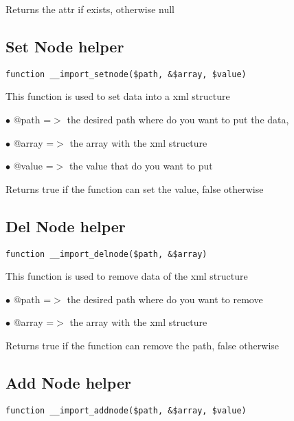 \documentclass[a4paper]{book}
\begin{document}
Returns the attr if exists, otherwise null

\hypertarget{toc161}{}
\subsection{Set Node helper}

\begin{lstlisting}
function __import_setnode($path, &$array, $value)
\end{lstlisting}

This function is used to set data into a xml structure

\begin{compactitem}
\item[\color{myblue}$\bullet$] @path  =$>$ the desired path where do you want to put the data,
\item[\color{myblue}$\bullet$] @array =$>$ the array with the xml structure
\item[\color{myblue}$\bullet$] @value =$>$ the value that do you want to put
\end{compactitem}

Returns true if the function can set the value, false otherwise

\hypertarget{toc162}{}
\subsection{Del Node helper}

\begin{lstlisting}
function __import_delnode($path, &$array)
\end{lstlisting}

This function is used to remove data of the xml structure

\begin{compactitem}
\item[\color{myblue}$\bullet$] @path  =$>$ the desired path where do you want to remove
\item[\color{myblue}$\bullet$] @array =$>$ the array with the xml structure
\end{compactitem}

Returns true if the function can remove the path, false otherwise

\hypertarget{toc163}{}
\subsection{Add Node helper}

\begin{lstlisting}
function __import_addnode($path, &$array, $value)
\end{lstlisting}
\end{document}

